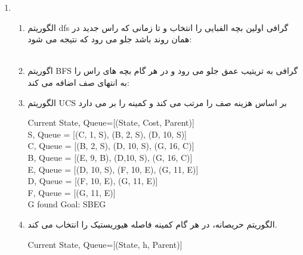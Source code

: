 \documentclass[11pt]{article}
\begin{document}
\begin{enumerate}
\begin{enumerate}
	\end{enumerate}
\item
\begin{enumerate}
	\item 
	الگوریتم dfs گرافی اولین بچه الفبایی را انتخاب و تا زمانی که راس جدید در همان روند باشد جلو می رود که نتیجه می شود:\\
 \\
	\item
اگوریتم BFS گرافی به تریتیب عمق جلو می رود و در هر گام بچه های راس را به انتهای صف اضافه می کند:\\
\item
الگوریتم UCS بر اساس هزینه صف را مرتب می کند و کمینه را بر می دارد\\
\begin{latin}
	Current State, Queue=[(State, Cost, Parent)]\\
	
	S, Queue = [(C, 1, S), (B, 2, S), (D, 10, S)]\\
	C, Queue = [(B, 2, S), (D, 10, S), (G, 16, C)]\\
	B, Queue = [(E, 9, B), (D,10, S), (G, 16, C)]\\
	E, Queue = [(D, 10, S), (F, 10, E), (G, 11, E)]\\
	D, Queue = [(F, 10, E), (G, 11, E)]\\
	F, Queue = [(G, 11, E)]\\
	G found Goal: SBEG
\end{latin}
	\item
	الگوریتم حریصانه، در هر گام کمینه فاصله هیوریستیک را انتخاب می کند.\\
	\begin{latin}
	Current State, Queue=[(State, h, Parent)]\\
	

\end{latin}
\end{enumerate}
\end{enumerate}
\end{document}
